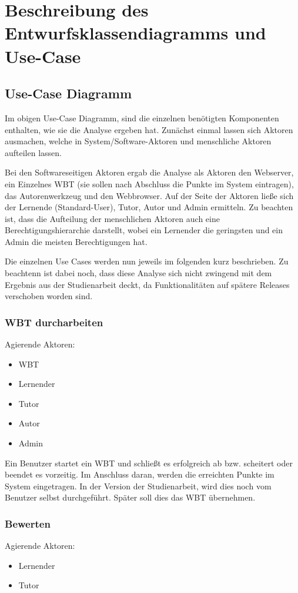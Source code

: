 \section{Beschreibung des Entwurfsklassendiagramms und
Use-Case}\label{ref:classModel}

\subsection{Use-Case Diagramm}
Im obigen Use-Case Diagramm, sind die einzelnen benötigten Komponenten
enthalten, wie sie die Analyse ergeben hat. Zunächst einmal lassen sich Aktoren
ausmachen, welche in System/Software-Aktoren und menschliche Aktoren aufteilen
lassen. 

Bei den Softwareseitigen Aktoren ergab die Analyse als Aktoren den Webserver,
ein Einzelnes WBT (sie sollen nach Abschluss die Punkte im System eintragen),
das Autorenwerkzeug und den Webbrowser. Auf der Seite der Aktoren ließe sich der
Lernende (Standard-User), Tutor, Autor und Admin ermitteln. Zu beachten ist,
dass die Aufteilung der menschlichen Aktoren auch eine Berechtigungshierarchie
darstellt, wobei ein Lernender die geringsten und ein Admin die meisten
Berechtigungen hat.

Die einzelnen Use Cases werden nun jeweils im folgenden kurz beschrieben. Zu
beachtenn ist dabei noch, dass diese Analyse sich nicht zwingend mit dem
Ergebnis aus der Studienarbeit deckt, da Funktionalitäten auf spätere Releases
verschoben worden sind.

\subsubsection{WBT durcharbeiten} 
Agierende Aktoren: \begin{itemize}
  \item WBT
  \item Lernender
  \item Tutor
  \item Autor
  \item Admin 
\end{itemize}

Ein Benutzer startet ein WBT und schließt es erfolgreich ab bzw.
scheitert oder beendet es vorzeitig. Im Anschluss daran, werden die erreichten
Punkte im System eingetragen. In der Version der Studienarbeit, wird dies noch
vom Benutzer selbst durchgeführt. Später soll dies das WBT übernehmen.
	
\subsubsection{Bewerten}
Agierende Aktoren: \begin{itemize}
  \item Lernender
  \item Tutor
\end{itemize} 

